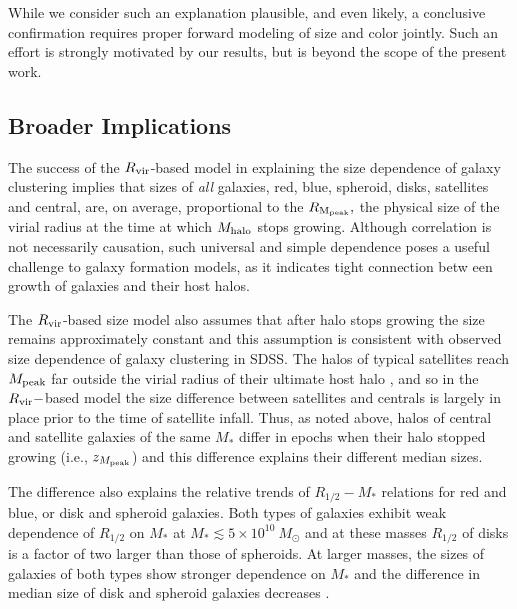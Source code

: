 \documentclass[usenatbib,usegraphicx,letterpaper]{mn2e}
\newcommand{\rhalf}{R_{1/2}}
\newcommand{\mstar}{M_{\ast}}
\newcommand{\mpeak}{M_{\rm peak}}
\newcommand{\zpeak}{z_{M_{\rm peak}}}
\newcommand{\mhalo}{M_{\rm halo}}
\newcommand{\rvir}{R_{\rm vir}}
\newcommand{\rmpeak}{R_{\rm M_{peak}}}
\begin{document}
While we consider such an explanation plausible, and even likely, a conclusive confirmation requires proper forward modeling of size and color jointly. Such an effort is strongly motivated by our results, but is beyond the scope of the present work. 

\subsection{Broader Implications}
\label{subsec:broader_implications}

The success of the $\rvir$-based model in explaining the size dependence of galaxy clustering implies that sizes of {\it all} galaxies,  red, blue, spheroid, disks, satellites and central, are, on average, proportional to the $\rmpeak,$ the physical size of the virial radius at the time at which $\mhalo$ stops growing. Although correlation is not necessarily causation, such universal and simple dependence poses a useful challenge to galaxy formation models, as it indicates tight connection betw
een growth of galaxies and their host halos. 

The $\rvir$-based size model also assumes that after halo stops growing the size remains approximately constant and this assumption is consistent with observed size dependence of galaxy clustering in SDSS.  The halos of typical satellites reach $\mpeak$ far outside the virial radius of their ultimate host halo \citep{behroozi_etal14}, and so in the $\rvir-$based model the size difference between satellites and centrals is largely in place prior to the time of satellite infall. 
Thus, as noted above, halos of central and satellite galaxies of the same $\mstar$  differ in epochs when their halo stopped growing (i.e., $\zpeak$) and this difference explains their different median sizes.

The difference also explains the relative trends of $\rhalf-\mstar$ relations for red and blue, or disk and spheroid galaxies.
Both types of galaxies exhibit weak dependence of $\rhalf$ on $\mstar$ at $\mstar\lesssim 5\times 10^{10}\ M_\odot$ and 
at these masses $\rhalf$ of disks is a factor of two larger than those of spheroids. At larger masses, the sizes of galaxies of both types show stronger dependence on $\mstar$ and the difference in median size of disk and spheroid galaxies decreases \citep[e.g.,][]{bernardi_etal14}. 
\end{document}
